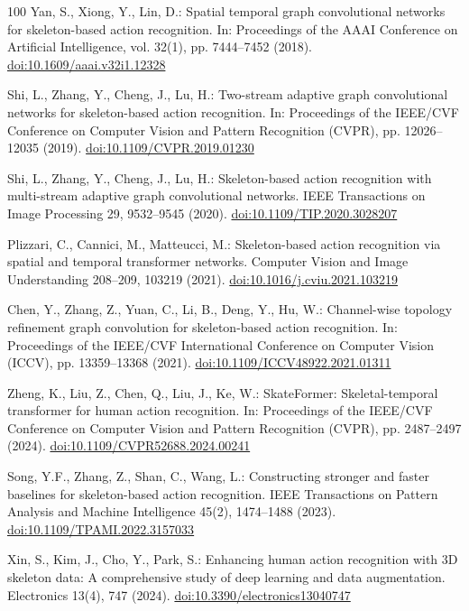 \documentclass[preprint,12pt]{elsarticle}
\begin{document}
\begin{thebibliography}{100}
Yan, S., Xiong, Y., Lin, D.: Spatial temporal graph convolutional networks for skeleton-based action recognition. In: Proceedings of the AAAI Conference on Artificial Intelligence, vol. 32(1), pp. 7444--7452 (2018). \href{https://doi.org/10.1609/aaai.v32i1.12328}{doi:10.1609/aaai.v32i1.12328}

Shi, L., Zhang, Y., Cheng, J., Lu, H.: Two-stream adaptive graph convolutional networks for skeleton-based action recognition. In: Proceedings of the IEEE/CVF Conference on Computer Vision and Pattern Recognition (CVPR), pp. 12026--12035 (2019). \href{https://doi.org/10.1109/CVPR.2019.01230}{doi:10.1109/CVPR.2019.01230}

Shi, L., Zhang, Y., Cheng, J., Lu, H.: Skeleton-based action recognition with multi-stream adaptive graph convolutional networks. IEEE Transactions on Image Processing 29, 9532--9545 (2020). \href{https://doi.org/10.1109/TIP.2020.3028207}{doi:10.1109/TIP.2020.3028207}

Plizzari, C., Cannici, M., Matteucci, M.: Skeleton-based action recognition via spatial and temporal transformer networks. Computer Vision and Image Understanding 208--209, 103219 (2021). \href{https://doi.org/10.1016/j.cviu.2021.103219}{doi:10.1016/j.cviu.2021.103219}

Chen, Y., Zhang, Z., Yuan, C., Li, B., Deng, Y., Hu, W.: Channel-wise topology refinement graph convolution for skeleton-based action recognition. In: Proceedings of the IEEE/CVF International Conference on Computer Vision (ICCV), pp. 13359--13368 (2021). \href{https://doi.org/10.1109/ICCV48922.2021.01311}{doi:10.1109/ICCV48922.2021.01311}

Zheng, K., Liu, Z., Chen, Q., Liu, J., Ke, W.: SkateFormer: Skeletal-temporal transformer for human action recognition. In: Proceedings of the IEEE/CVF Conference on Computer Vision and Pattern Recognition (CVPR), pp. 2487--2497 (2024). \href{https://doi.org/10.1109/CVPR52688.2024.00241}{doi:10.1109/CVPR52688.2024.00241}

Song, Y.F., Zhang, Z., Shan, C., Wang, L.: Constructing stronger and faster baselines for skeleton-based action recognition. IEEE Transactions on Pattern Analysis and Machine Intelligence 45(2), 1474--1488 (2023). \href{https://doi.org/10.1109/TPAMI.2022.3157033}{doi:10.1109/TPAMI.2022.3157033}

Xin, S., Kim, J., Cho, Y., Park, S.: Enhancing human action recognition with 3D skeleton data: A comprehensive study of deep learning and data augmentation. Electronics 13(4), 747 (2024). \href{https://doi.org/10.3390/electronics13040747}{doi:10.3390/electronics13040747}


\end{thebibliography}
\end{document}
